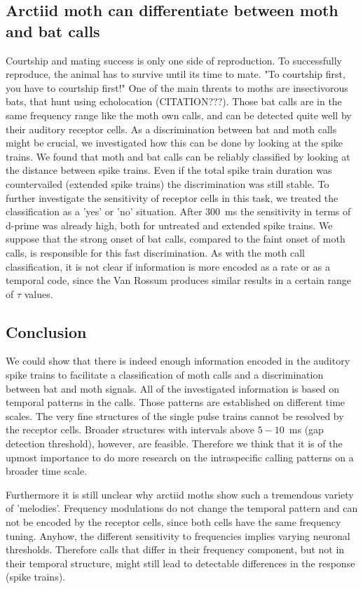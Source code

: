\documentclass[12pt,a4paper,pdftex]{article}
\begin{document}
\subsection*{Arctiid moth can differentiate between moth and bat calls}
Courtship and mating success is only one side of reproduction. To successfully reproduce, the animal has to survive until its time to mate. "To courtship first, you have to courtship first!" One of the main threats to moths are insectivorous bats, that hunt using echolocation (CITATION???). Those bat calls are in the same frequency range like the moth own calls, and can be detected quite well by their auditory receptor cells. As a discrimination between bat and moth calls might be crucial, we investigated how this can be done by looking at the spike trains. We found that moth and bat calls can be reliably classified by looking at the distance between spike trains. Even if the total spike train duration was countervailed (extended spike trains) the discrimination was still stable. To further investigate the sensitivity of receptor cells in this task, we treated the classification as a 'yes' or 'no' situation. After 300~ms the sensitivity in terms of d-prime was already high, both for untreated and extended spike trains. We suppose that the strong onset of bat calls, compared to the faint onset of moth calls, is responsible for this fast discrimination. As with the moth call classification, it is not clear if information is more encoded as a rate or as a temporal code, since the Van Rossum produces similar results in a certain range of $ \tau $ values.

\newpage
\subsection*{Conclusion} 
We could show that there is indeed enough information encoded in the auditory spike trains to facilitate a classification of moth calls and a discrimination between bat and moth signals. All of the investigated information is based on temporal patterns in the calls. Those patterns are established on different time scales. The very fine structures of the single pulse trains cannot be resolved by the receptor cells. Broader structures with intervals above $5-10$~ms (gap detection threshold), however, are feasible. Therefore we think that it is of the upmost importance to do more research on the intraspecific calling patterns on a broader time scale. 

Furthermore it is still unclear why arctiid moths show such a tremendous variety of 'melodies'. Frequency modulations do not change the temporal pattern and can not be encoded by the receptor cells, since both cells have the same frequency tuning. Anyhow, the different sensitivity to frequencies implies varying neuronal thresholds. Therefore calls that differ in their frequency component, but not in their temporal structure, might still lead to detectable differences in the response (spike trains). 
\end{document}
